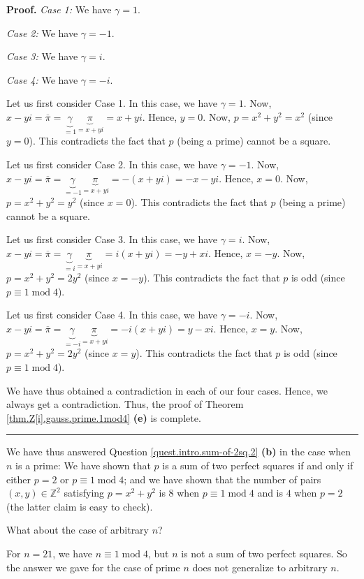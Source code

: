 \documentclass[numbers=enddot,12pt,final,onecolumn,notitlepage]{scrartcl}%
\numberwithin{exer}{subsection}
\theoremstyle{definition}
\newenvironment{proof}[1][Proof]{\noindent\textbf{#1.} }{\ \rule{0.5em}{0.5em}}
\begin{document}
\begin{proof}
\textit{Case 1:} We have $\gamma=1$.

\textit{Case 2:} We have $\gamma=-1$.

\textit{Case 3:} We have $\gamma=i$.

\textit{Case 4:} We have $\gamma=-i$.

Let us first consider Case 1. In this case, we have $\gamma=1$. Now,
$x-yi=\overline{\pi}=\underbrace{\gamma}_{=1}\underbrace{\pi}_{=x+yi}=x+yi$.
Hence, $y=0$. Now, $p=x^{2}+y^{2}=x^{2}$ (since $y=0$). This contradicts the
fact that $p$ (being a prime) cannot be a square.

Let us first consider Case 2. In this case, we have $\gamma=-1$. Now,
$x-yi=\overline{\pi}=\underbrace{\gamma}_{=-1}\underbrace{\pi}_{=x+yi}%
=-\left(  x+yi\right)  =-x-yi$. Hence, $x=0$. Now, $p=x^{2}+y^{2}=y^{2}$
(since $x=0$). This contradicts the fact that $p$ (being a prime) cannot be a square.

Let us first consider Case 3. In this case, we have $\gamma=i$. Now,
$x-yi=\overline{\pi}=\underbrace{\gamma}_{=i}\underbrace{\pi}_{=x+yi}=i\left(
x+yi\right)  =-y+xi$. Hence, $x=-y$. Now, $p=x^{2}+y^{2}=2y^{2}$ (since
$x=-y$). This contradicts the fact that $p$ is odd (since $p\equiv
1\operatorname{mod}4$).

Let us first consider Case 4. In this case, we have $\gamma=-i$. Now,
$x-yi=\overline{\pi}=\underbrace{\gamma}_{=-i}\underbrace{\pi}_{=x+yi}%
=-i\left(  x+yi\right)  =y-xi$. Hence, $x=y$. Now, $p=x^{2}+y^{2}=2y^{2}$
(since $x=y$). This contradicts the fact that $p$ is odd (since $p\equiv
1\operatorname{mod}4$).

We have thus obtained a contradiction in each of our four cases. Hence, we
always get a contradiction. Thus, the proof of Theorem
\ref{thm.Z[i].gauss.prime.1mod4} \textbf{(e)} is complete.
\end{proof}

We have thus answered Question \ref{quest.intro.sum-of-2sq.2} \textbf{(b)} in
the case when $n$ is a prime: We have shown that $p$ is a sum of two perfect
squares if and only if either $p=2$ or $p\equiv1\operatorname{mod}4$; and we
have shown that the number of pairs $\left(  x,y\right)  \in\mathbb{Z}^{2}$
satisfying $p=x^{2}+y^{2}$ is $8$ when $p\equiv1\operatorname{mod}4$ and is
$4$ when $p=2$ (the latter claim is easy to check).

What about the case of arbitrary $n$?

For $n=21$, we have $n\equiv1\operatorname{mod}4$, but $n$ is not a sum of two
perfect squares. So the answer we gave for the case of prime $n$ does not
generalize to arbitrary $n$.
\end{document}
